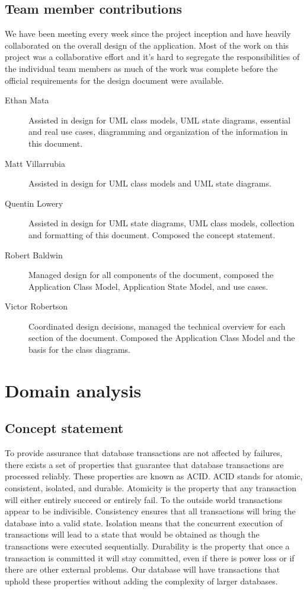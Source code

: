 \documentclass[a4paper]{report}
\begin{document}
\section[Contributors]{Team member contributions}

We have been meeting every week since the project inception and have heavily collaborated on the overall design of the application.  Most of the work on this project was a collaborative effort and it's hard to segregate the responsibilities of the individual team members as much of the work was complete before the official requirements for the design document were available.

\begin{description}
	\item[Ethan Mata] Assisted in design for UML class models, UML state diagrams, essential and real use cases, diagramming and organization of the information in this document.
	\item[Matt Villarrubia] Assisted in design for UML class models and UML state diagrams.
	\item[Quentin Lowery] Assisted in design for UML state diagrams, UML class models, collection and formatting of this document.  Composed the concept statement.
	\item[Robert Baldwin] Managed design for all components of the document, composed the Application Class Model, Application State Model, and use cases.
	\item[Victor Robertson] Coordinated design decisions, managed the technical overview for each section of the document.  Composed the Application Class Model and the basis for the class diagrams.
\end{description}

\chapter{Domain analysis}

\section{Concept statement}

	To provide assurance that database transactions are not affected by failures, there exists a set of properties that guarantee that database transactions are processed reliably. These properties are known as ACID. ACID stands for atomic, consistent, isolated, and durable. Atomicity is the property that any transaction will either entirely succeed or entirely fail. To the outside world transactions appear to be indivisible. Consistency ensures that all transactions will bring the database into a valid state. Isolation means that the concurrent execution of transactions will lead to a state that would be obtained as though the transactions were executed sequentially. Durability is the property that once a transaction is committed it will stay committed, even if there is power loss or if there are other external problems. Our database will have transactions that uphold these properties without adding the complexity of larger databases.
\end{document}
